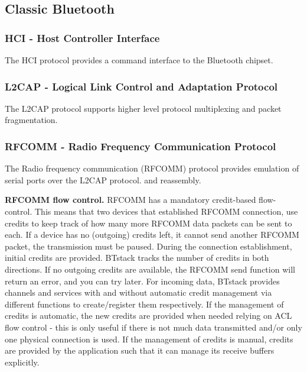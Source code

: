 \subsection{Classic Bluetooth}
\subsubsection{HCI - Host Controller Interface}
The HCI protocol provides a command interface to the Bluetooth chipset. 

\subsubsection{L2CAP -  Logical Link Control and Adaptation Protocol}
The L2CAP protocol supports higher level protocol multiplexing and packet fragmentation.


\subsubsection{RFCOMM - Radio Frequency Communication Protocol}
The Radio frequency communication (RFCOMM) protocol provides emulation of serial ports over the L2CAP protocol.
and reassembly. 

\textbf{RFCOMM flow control.}
RFCOMM has a mandatory credit-based flow-control. This means that two devices that established RFCOMM connection, use credits to keep track of how many more RFCOMM data packets can be sent to each. If a device has no (outgoing) credits left, it cannot send another RFCOMM packet, the transmission must be paused. During the connection establishment, initial credits are provided. BTstack tracks the number of credits in both directions. If no outgoing credits are available, the RFCOMM send function will return an error, and you can try later. For incoming data, BTstack provides channels and services with and without automatic credit management via different functions to create/register them respectively. If the management of credits is automatic, the new credits are provided when needed relying on ACL flow control - this is only useful if there is not much data transmitted and/or only one physical connection is used. If the management of credits is manual, credits are provided by the application such that it can manage its receive buffers explicitly. 

